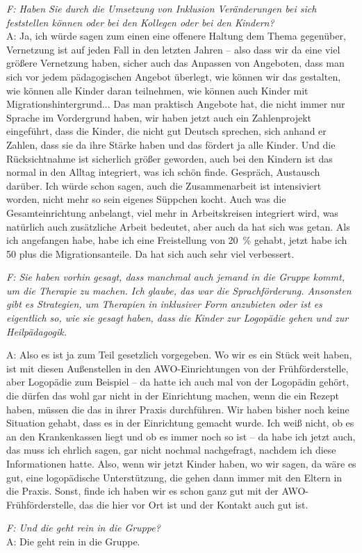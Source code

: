 \begin{linenumbers*}
\emph{F: Haben Sie durch die Umsetzung von Inklusion Veränderungen bei sich feststellen können oder bei den Kollegen oder bei den Kindern?}\\
A: Ja, ich würde sagen zum einen eine offenere Haltung dem Thema gegenüber, Vernetzung ist auf jeden Fall in den letzten Jahren -- also dass wir da eine viel größere Vernetzung haben, sicher auch das Anpassen von Angeboten, dass man sich vor jedem pädagogischen Angebot überlegt, wie können wir das gestalten, wie können alle Kinder daran teilnehmen, wie können auch Kinder mit Migrationshintergrund... Das man praktisch Angebote hat, die nicht immer nur Sprache im Vordergrund haben, wir haben jetzt auch ein  Zahlenprojekt eingeführt, dass die Kinder, die nicht gut Deutsch sprechen, sich anhand er Zahlen, dass sie da ihre Stärke haben und das fördert ja alle Kinder. Und die Rücksichtnahme ist sicherlich größer geworden, auch bei den Kindern ist das normal in den Alltag integriert, was ich schön finde. Gespräch, Austausch darüber. Ich würde schon sagen, auch die Zusammenarbeit ist intensiviert worden, nicht mehr so sein eigenes Süppchen kocht. Auch was die Gesamteinrichtung anbelangt, viel mehr in Arbeitskreisen integriert wird, was natürlich auch zusätzliche Arbeit bedeutet, aber auch da hat sich was getan. Als ich angefangen habe, habe ich eine Freistellung von 20~\% gehabt, jetzt habe ich 50 plus die Migrationsanteile. Da hat sich auch sehr viel verbessert.  

\emph{F: Sie haben vorhin gesagt, dass manchmal auch jemand in die Gruppe kommt, um die Therapie zu machen. Ich glaube, das war die Sprachförderung. Ansonsten gibt es Strategien, um Therapien in inklusiver Form anzubieten oder ist es eigentlich so, wie sie gesagt haben, dass die Kinder zur Logopädie gehen und zur Heilpädagogik.}

A: Also es ist ja zum Teil gesetzlich vorgegeben. Wo wir es ein Stück weit haben, ist mit diesen Außenstellen in den AWO-Einrichtungen von der Frühförderstelle, aber Logopädie zum Beispiel -- da hatte ich auch mal von der Logopädin gehört, die dürfen das wohl gar nicht in der Einrichtung machen, wenn die ein Rezept haben, müssen die das in ihrer Praxis durchführen. Wir haben bisher noch keine Situation gehabt, dass es in der Einrichtung gemacht wurde. Ich weiß nicht, ob es an den Krankenkassen liegt und ob es immer noch so ist -- da habe ich jetzt auch, das muss ich ehrlich sagen, gar nicht nochmal nachgefragt, nachdem ich diese Informationen hatte. Also, wenn wir jetzt Kinder haben, wo wir sagen, da wäre es gut, eine logopädische Unterstützung, die gehen dann immer mit den Eltern in die Praxis. Sonst, finde ich haben wir es schon ganz gut mit der AWO-Frühförderstelle, das die hier vor Ort ist und der Kontakt auch gut ist.

\emph{F: Und die geht rein in die Gruppe?}\\
A: Die geht rein in die Gruppe. 
\end{linenumbers*}
       
